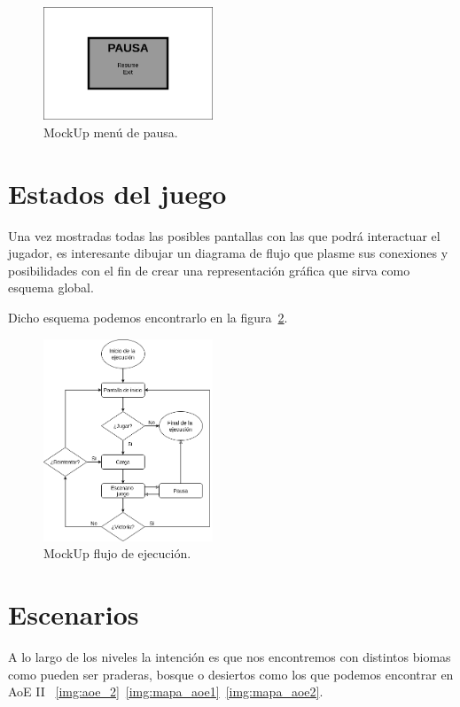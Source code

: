 \begin{figure}[ht]
\centering
\includegraphics[width=0.45\textwidth]{imagenes/gdd/pantallas/Pantalla_pausa.png}
\caption{MockUp menú de pausa.}
\label{mockup_pausa}
\end{figure}

\section{Estados del juego}
Una vez mostradas todas las posibles pantallas con las que podrá interactuar el jugador,
es interesante dibujar un diagrama de flujo que plasme sus conexiones y posibilidades
con el fin de crear una representación gráfica que sirva como esquema global.

Dicho esquema podemos encontrarlo en la figura~\ref{esq:flow_juego}.

\begin{figure}[ht]
\centering
\includegraphics[width=0.45\textwidth]{imagenes/gdd/pantallas/flow_ejecucion.png}
\caption{MockUp flujo de ejecución.}
\label{esq:flow_juego}
\end{figure}

\section{Escenarios}
A lo largo de los niveles la intención es que nos encontremos con distintos biomas como
pueden ser praderas, bosque o desiertos como los que podemos encontrar en \ac{AoE} II
~\ref{img:aoe_2}~\ref{img:mapa_aoe1}~\ref{img:mapa_aoe2}.

